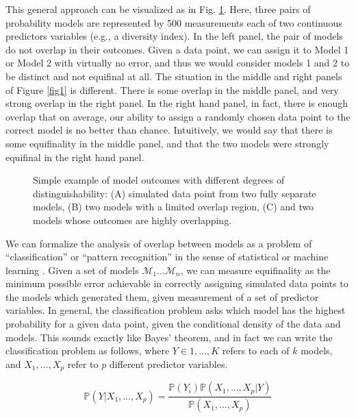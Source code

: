 \documentclass[10pt,letterpaper]{article}
\begin{document}
This general approach can be visualized as in Fig.
\ref{fig2}. Here, three pairs of probability models
are represented by 500 measurements each of two continuous predictors variables (e.g., a diversity index).
In the left panel, the pair of models do not overlap in their outcomes.
Given a data point, we can assign it to Model 1 or Model 2 with
virtually no error, and thus we would consider models 1 and 2 to be
distinct and not equifinal at all. The situation in the middle and right
panels of Figure \ref{fig1} is different. There is
some overlap in the middle panel, and very strong overlap in the right
panel. In the right hand panel, in fact, there is enough overlap that on
average, our ability to assign a randomly chosen data point to the
correct model is no better than chance. Intuitively, we would say that
there is some equifinality in the middle panel, and that the two models
were strongly equifinal in the right hand panel.

\begin{figure}[h]
\caption{Simple example of model outcomes with different degrees of distinguishability: (A) simulated data point from two fully separate models, (B) two models with a limited overlap region, (C) and two models whose outcomes are highly overlapping.}
\label{fig2}
\end{figure}


We can formalize the analysis of overlap between models as a problem of
``classification'' or ``pattern recognition'' in the sense of
statistical or machine learning \cite{hastie2009elements}. Given a set
of models \(\mathcal{M}_1 \ldots \mathcal{M}_n\), we can measure
equifinality as the minimum possible error achievable in correctly
assigning simulated data points to the models which generated them,
given measurement of a set of predictor variables. In general, the
classification problem asks which model has the highest probability for
a given data point, given the conditional density of the data and
models. This sounds exactly like Bayes' theorem, and in fact we can
write the classification problem as follows, where
\(Y \in 1, \ldots, K\) refers to each of \(k\) models, and
\(X_1, \ldots, X_p\) refer to \(p\) different predictor variables.

\begin{equation}
\mathbb{P}(Y | X_1, \ldots, X_p) = \frac{\mathbb{P}(Y_i) \mathbb{P}(X_1, \ldots, X_p | Y)}{\mathbb{P}(X_1, \ldots, X_p)}
\label{eq:bayes-rule-classification}
\end{equation}
\end{document}
